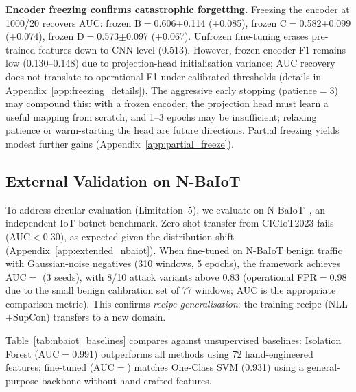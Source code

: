 \textbf{Encoder freezing confirms catastrophic forgetting.}
Freezing the encoder at 1000/20 recovers AUC:
frozen B$=$0.606$\pm$0.114 ($+$0.085), frozen C$=$0.582$\pm$0.099 ($+$0.074),
frozen D$=$0.573$\pm$0.097 ($+$0.067).
Unfrozen fine-tuning erases pre-trained features down to CNN level (0.513).
However, frozen-encoder F1 remains low (0.130--0.148) due to projection-head
initialisation variance; AUC recovery does not translate to operational F1
under calibrated thresholds (details in Appendix~\ref{app:freezing_details}).
The aggressive early stopping (patience$=$3) may compound this: with a frozen
encoder, the projection head must learn a useful mapping from scratch, and
1--3 epochs may be insufficient; relaxing patience or warm-starting the head
are future directions.
Partial freezing yields modest further gains
(Appendix~\ref{app:partial_freeze}).

\subsection{External Validation on N-BaIoT}
\label{sec:experiments:nbaiot}

To address circular evaluation (Limitation~5), we evaluate on
N-BaIoT~\cite{meidan2018n}, an independent IoT botnet benchmark.
Zero-shot transfer from CICIoT2023 fails (AUC$<$0.30), as expected
given the distribution shift (Appendix~\ref{app:extended_nbaiot}).
When fine-tuned on N-BaIoT benign traffic with Gaussian-noise negatives
(310 windows, 5 epochs), the framework achieves
AUC$=$\nbaiotAUC{} (3 seeds), with 8/10 attack variants above 0.83
(operational FPR$=$0.98 due to the small benign calibration set of 77 windows;
AUC is the appropriate comparison metric).
This confirms \emph{recipe generalisation}: the training recipe
(NLL$+$SupCon) transfers to a new domain.

Table~\ref{tab:nbaiot_baselines} compares against unsupervised baselines:
Isolation Forest (AUC$=$0.991) outperforms all methods using 72
hand-engineered features; \ours{} fine-tuned (AUC$=$\nbaiotAUC{})
matches One-Class SVM (0.931) using a general-purpose backbone
without hand-crafted features.


